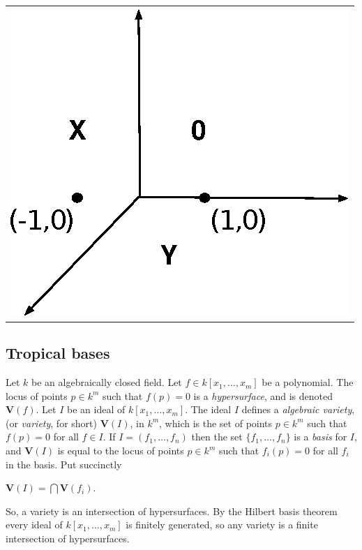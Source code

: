 \documentclass{article}
\begin{document}
\vspace{.1 in}
\begin{tabular}{c}
  \centering
  \hspace{1in}\includegraphics[scale=1]{Tropical-Line.eps}
\end{tabular}

\subsection{Tropical bases}

Let $k$ be an algebraically closed field. Let $f \in k[x_{1},\ldots,x_{m}]$ be a polynomial. The locus of points $p \in k^{m}$ such that $f(p) = 0$ is a \emph{hypersurface}, and is denoted $\textbf{V}(f)$. Let $I$ be an ideal of $k[x_{1},\ldots,x_{m}]$. The ideal $I$ defines a \emph{algebraic variety}, (or \emph{variety}, for short) $\textbf{V}(I)$, in $k^{m}$, which is the set of points $p \in k^{m}$ such that $f(p) = 0$ for all $f \in I$. If $I = (f_{1},\ldots,f_{n})$  then the set $\{f_{1},\ldots,f_{n}\}$ is a \emph{basis} for $I$, and $\textbf{V}(I)$ is equal to the locus of points $p \in k^{m}$ such that $f_{i}(p) = 0$ for all $f_{i}$ in the basis. Put succinctly
\begin{center}
  $\textbf{V}(I) = \bigcap \textbf{V}(f_{i})$.
\end{center}
So, a variety is an intersection of hypersurfaces. By the Hilbert basis theorem every ideal of $k[x_{1},\ldots,x_{m}]$ is finitely generated, so any variety is a finite intersection of hypersurfaces.
\end{document}

